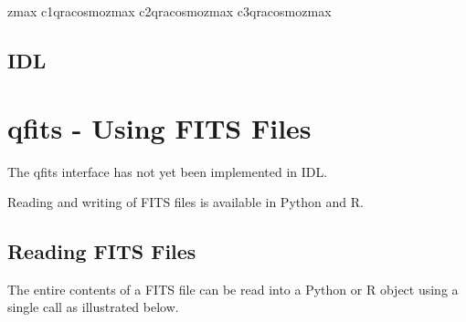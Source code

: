 \documentclass[letterpaper,10pt,english]{sphinxmanual}
\begin{document}
%
\begin{sphinxVerbatim}[commandchars=\\\{\}]
    zmax
    c1qra\PYGZus{}cosmozmax
    c2qra\PYGZus{}cosmozmax
    c3qra\PYGZus{}cosmozmax
\end{sphinxVerbatim}


\section{IDL}
\label{\detokenize{using_py_R_IDL:idl}}

\chapter{qfits - Using FITS Files}
\label{\detokenize{qfits:qfits-using-fits-files}}\label{\detokenize{qfits::doc}}
The qfits interface has not yet been implemented in IDL.

Reading and writing of FITS files is available in Python and R.


\section{Reading FITS Files}
\label{\detokenize{qfits_read:reading-fits-files}}\label{\detokenize{qfits_read::doc}}
The entire contents of a FITS file can be read into a Python or R object
using a single call as illustrated below.
\end{document}
